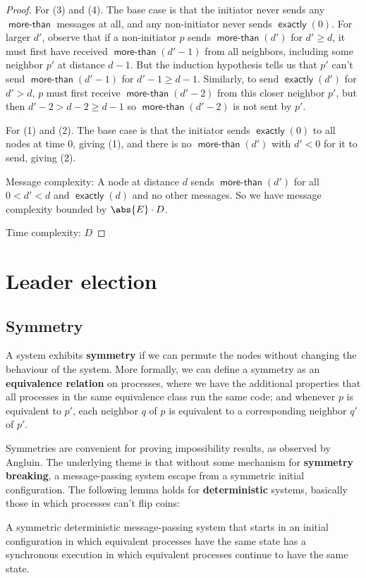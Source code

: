 \documentclass[11pt]{article}
\DeclareMathOperator{\exactly}{\textsf{exactly}}
\DeclareMathOperator{\morethan}{\textsf{more-than}}
\begin{document}
\begin{proof}
For (3) and (4). The base case is that the initiator never sends any \(\morethan\) messages at all,
and any non-initiator never sends \(\exactly(0)\). For larger \(d'\), observe that if a non-initiator
\(p\) sends \(\morethan(d')\) for \(d'\ge d\), it must first have received \(\morethan(d'-1)\) from all
neighbors, including some neighbor \(p'\) at distance \(d-1\). But the induction hypothesis tells us
that \(p'\) can't send \(\morethan(d'-1)\) for \(d'-1\ge d-1\). Similarly, to send \(\exactly(d')\) for
\(d'>d\), \(p\) must first receive \(\morethan(d'-2)\) from this closer neighbor \(p'\), but then
\(d'-2>d-2\ge d-1\) so \(\morethan(d'-2)\) is not sent by \(p'\).

For (1) and (2). The base case is that the initiator sends \(\exactly(0)\) to all nodes at time 0,
giving (1), and there is no \(\morethan(d')\) with \(d'<0\) for it to send, giving (2).

Message complexity: A node at distance \(d\) sends \(\morethan(d')\) for all \(0<d'<d\) and
\(\exactly(d)\) and no other messages. So we have message complexity bounded by \(\abs{E}\cdot D\).

Time complexity: \(D\)
\end{proof}
\section{Leader election}
\label{sec:org9427c3f}
\subsection{Symmetry}
\label{sec:org1637d12}
A system exhibits \textbf{symmetry} if we can permute the nodes without changing the behaviour of the system.
More formally, we can define a symmetry as an \textbf{equivalence relation} on processes, where we have the
additional properties that all processes in the same equivalence class run the same code; and whenever
\(p\) is equivalent to \(p'\), each neighbor \(q\) of \(p\) is equivalent to a corresponding neighbor
\(q'\) of \(p'\).

Symmetries are convenient for proving impossibility results, as observed by Angluin. The underlying
theme is that without some mechanism for  \textbf{symmetry breaking}, a message-passing system escape from a
symmetric initial configuration. The following lemma holds for \textbf{deterministic} systems, basically those
in which processes can’t flip coins:
\begin{lemma}[]
\label{5.1.1}
    A symmetric deterministic message-passing system that starts in an initial configuration in which
    equivalent processes have the same state has a synchronous execution in which equivalent processes
    continue to have the same state.
\end{lemma}
\end{document}
